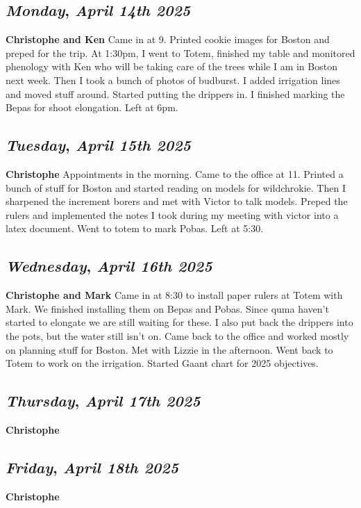 \def\day{\textit{April 14th 2025}}
\def\weekday{\textit{Monday}}
\subsection*{\weekday, \day}
\textbf {Christophe and Ken}
Came in at 9. Printed cookie images for Boston and preped for the trip. At 1:30pm, I went to Totem, finished my table and monitored phenology with Ken who will be taking care of the trees while I am in Boston next week. Then I took a bunch of photos of budburst. I added irrigation lines and moved stuff around. Started putting the drippers in. I finished marking the Bepas for shoot elongation. Left at 6pm. 

\def\day{\textit{April 15th 2025}}
\def\weekday{\textit{Tuesday}}
\subsection*{\weekday, \day}
\textbf {Christophe}
Appointments in the morning. Came to the office at 11. Printed a bunch of stuff for Boston and started reading on models for wildchrokie. Then I sharpened the increment borers and met with Victor to talk models. Preped the rulers and implemented the notes I took during my meeting with victor into a latex document. Went to totem to mark Pobas. Left at 5:30.

\def\day{\textit{April 16th 2025}}
\def\weekday{\textit{Wednesday}}
\subsection*{\weekday, \day}
\textbf {Christophe and Mark}
Came in at 8:30 to install paper rulers at Totem with Mark.	We finished installing them on Bepas and Pobas. Since quma haven't started to elongate we are still waiting for these. I also put back the drippers into the pots, but the water still isn't on. Came back to the office and worked mostly on planning stuff for Boston. Met with Lizzie in the afternoon. Went back to Totem to work on the irrigation. Started Gaant chart for 2025 objectives. 
\def\day{\textit{April 17th 2025}}
\def\weekday{\textit{Thursday}}
\subsection*{\weekday, \day}
\textbf {Christophe}

\def\day{\textit{April 18th 2025}}
\def\weekday{\textit{Friday}}
\subsection*{\weekday, \day}
\textbf {Christophe}

